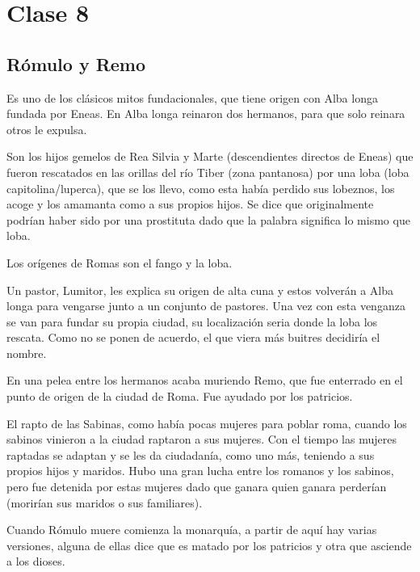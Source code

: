 \chapter{Clase 8}\label{ch:clase8}
\section{Rómulo y Remo}
Es uno de los clásicos mitos fundacionales, que tiene origen con Alba longa fundada por Eneas. En Alba longa reinaron dos hermanos, para que solo reinara otros le expulsa.

Son los hijos gemelos de Rea Silvia y Marte (descendientes directos de Eneas) que fueron rescatados en las orillas del río Tiber (zona pantanosa) por una loba (loba capitolina/luperca), que se los llevo, como esta había perdido sus lobeznos, los acoge y los amamanta como a sus propios hijos. Se dice que originalmente podrían haber sido por una prostituta dado que la palabra significa lo mismo que loba.

Los orígenes de Romas son el fango y la loba.

Un pastor, Lumitor, les explica su origen de alta cuna y estos volverán a Alba longa para vengarse junto a un conjunto de pastores. Una vez con esta venganza se van para fundar su propia ciudad, su localización seria donde la loba los rescata. Como no se ponen de acuerdo, el que viera más buitres decidiría el nombre.

En una pelea entre los hermanos acaba muriendo Remo, que fue enterrado en el punto de origen de la ciudad de Roma. Fue ayudado por los patricios.

El rapto de las Sabinas, como había pocas mujeres para poblar roma, cuando los sabinos vinieron a la ciudad raptaron a sus mujeres. Con el tiempo las mujeres raptadas se adaptan y se les da ciudadanía, como uno más, teniendo a sus propios hijos y maridos. Hubo una gran lucha entre los romanos y los sabinos, pero fue detenida por estas mujeres dado que ganara quien ganara perderían (morirían sus maridos o sus familiares).

Cuando Rómulo muere comienza la monarquía, a partir de aquí hay varias versiones, alguna de ellas dice que es matado por los patricios y otra que asciende a los dioses.

